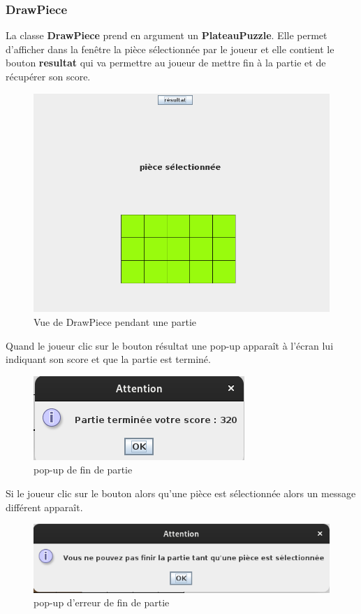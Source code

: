 \documentclass[a4paper,12pt]{article} %
\begin{document}
\subsubsection{DrawPiece}
La classe \textbf{DrawPiece} prend en argument un \textbf{PlateauPuzzle}. Elle permet d'afficher dans la fenêtre la pièce sélectionnée par le joueur et elle contient le bouton \textbf{resultat} qui va permettre au joueur de mettre fin à la partie et de récupérer son score. 

\begin{figure}[ht]
    \centering
    \includegraphics[width=0.5\linewidth]{images/pieceSelect.png}
    \caption{Vue de DrawPiece pendant une partie}
\end{figure}

Quand le joueur clic sur le bouton résultat une pop-up apparaît à l'écran lui indiquant son score et que la partie est terminé.  

\begin{figure}[ht]
    \centering
    \includegraphics[width=0.5\linewidth]{images/endGame.png}
    \caption{pop-up de fin de partie}
\end{figure}

Si le joueur clic sur le bouton alors qu'une pièce est sélectionnée alors un message différent apparaît.

\begin{figure}[ht]
    \centering
    \includegraphics[width=0.5\linewidth]{images/erreurEndGame.png}
    \caption{pop-up d'erreur de fin de partie}
\end{figure}
\end{document}

